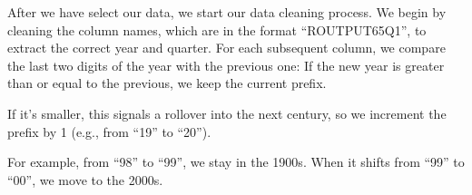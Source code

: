 \documentclass[
]{article}
\newenvironment{Shaded}{\begin{snugshade}}{\end{snugshade}}
\newcommand{\CommentTok}[1]{\textcolor[rgb]{0.56,0.35,0.01}{\textit{#1}}}
\newcommand{\ControlFlowTok}[1]{\textcolor[rgb]{0.13,0.29,0.53}{\textbf{#1}}}
\newcommand{\DecValTok}[1]{\textcolor[rgb]{0.00,0.00,0.81}{#1}}
\newcommand{\FunctionTok}[1]{\textcolor[rgb]{0.13,0.29,0.53}{\textbf{#1}}}
\newcommand{\NormalTok}[1]{#1}
\newcommand{\OtherTok}[1]{\textcolor[rgb]{0.56,0.35,0.01}{#1}}
\newcommand{\SpecialCharTok}[1]{\textcolor[rgb]{0.81,0.36,0.00}{\textbf{#1}}}
\newcommand{\StringTok}[1]{\textcolor[rgb]{0.31,0.60,0.02}{#1}}
\begin{document}
\begin{Shaded}
\end{Shaded}

After we have select our data, we start our data cleaning process. We
begin by cleaning the column names, which are in the format
``ROUTPUT65Q1'', to extract the correct year and quarter. For each
subsequent column, we compare the last two digits of the year with the
previous one: If the new year is greater than or equal to the previous,
we keep the current prefix.

If it's smaller, this signals a rollover into the next century, so we
increment the prefix by 1 (e.g., from ``19'' to ``20'').

For example, from ``98'' to ``99'', we stay in the 1900s. When it shifts
from ``99'' to ``00'', we move to the 2000s.
\end{document}
